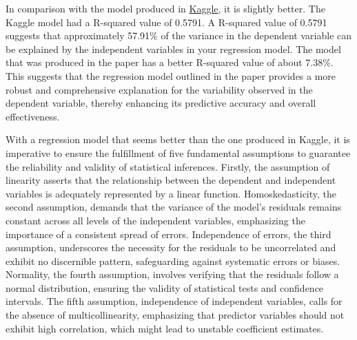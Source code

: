 \documentclass[12pt]{article}
\begin{document}
In comparison with the model produced in \href{https://www.kaggle.com/code/ashydv/housing-price-prediction-linear-regression/notebook}{Kaggle}, it is slightly better. The Kaggle model had a R-squared value of 0.5791. A R-squared value of 0.5791 suggests that approximately 57.91\% of the variance in the dependent variable can be explained by the independent variables in your regression model. The model that was produced in the paper has a better R-squared value of about 7.38\%. This suggests that the regression model outlined in the paper provides a more robust and comprehensive explanation for the variability observed in the dependent variable, thereby enhancing its predictive accuracy and overall effectiveness.

With a regression model that seems better than the one produced in Kaggle, it is imperative to ensure the fulfillment of five fundamental assumptions to guarantee the reliability and validity of statistical inferences. Firstly, the assumption of linearity asserts that the relationship between the dependent and independent variables is adequately represented by a linear function. Homoskedasticity, the second assumption, demands that the variance of the model's residuals remains constant across all levels of the independent variables, emphasizing the importance of a consistent spread of errors. Independence of errors, the third assumption, underscores the necessity for the residuals to be uncorrelated and exhibit no discernible pattern, safeguarding against systematic errors or biases. Normality, the fourth assumption, involves verifying that the residuals follow a normal distribution, ensuring the validity of statistical tests and confidence intervals. The fifth assumption, independence of independent variables, calls for the absence of multicollinearity, emphasizing that predictor variables should not exhibit high correlation, which might lead to unstable coefficient estimates.\cite{CFA}
\end{document}
